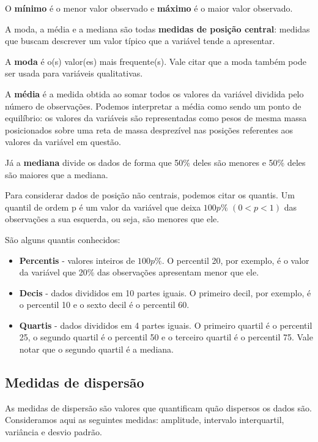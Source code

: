 \documentclass[
]{book}
\begin{document}
O \textbf{mínimo} é o menor valor observado e \textbf{máximo} é o maior valor observado.

A moda, a média e a mediana são todas \textbf{medidas de posição central}: medidas que buscam descrever um valor típico que a variável tende a apresentar.

A \textbf{moda} é o(s) valor(es) mais frequente(s). Vale citar que a moda também pode ser usada para variáveis qualitativas.

A \textbf{média} é a medida obtida ao somar todos os valores da variável dividida pelo número de observações. Podemos interpretar a média como sendo um ponto de equilíbrio: os valores da variáveis são representadas como pesos de mesma massa posicionados sobre uma reta de massa desprezível nas posições referentes aos valores da variável em questão.

Já a \textbf{mediana} divide os dados de forma que 50\% deles são menores e 50\% deles são maiores que a mediana.

Para considerar dados de posição não centrais, podemos citar os quantis. Um quantil de ordem p é um valor da variável que deixa \(100p\%\) \((0 < p < 1)\) das observações a sua esquerda, ou seja, são menores que ele.

São alguns quantis conhecidos:

\begin{itemize}
\item
  \textbf{Percentis} - valores inteiros de \(100p\%\). O percentil 20, por exemplo, é o valor da variável que 20\% das observações apresentam menor que ele.
\item
  \textbf{Decis} - dados divididos em 10 partes iguais. O primeiro decil, por exemplo, é o percentil 10 e o sexto decil é o percentil 60.
\item
  \textbf{Quartis} - dados divididos em 4 partes iguais. O primeiro quartil é o percentil 25, o segundo quartil é o percentil 50 e o terceiro quartil é o percentil 75.
  Vale notar que o segundo quartil é a mediana.
\end{itemize}

\hypertarget{medidas-de-dispersuxe3o}{%
\subsection{Medidas de dispersão}\label{medidas-de-dispersuxe3o}}

As medidas de dispersão são valores que quantificam quão dispersos os dados são. Consideramos aqui as seguintes medidas: amplitude, intervalo interquartil, variância e desvio padrão.
\end{document}
